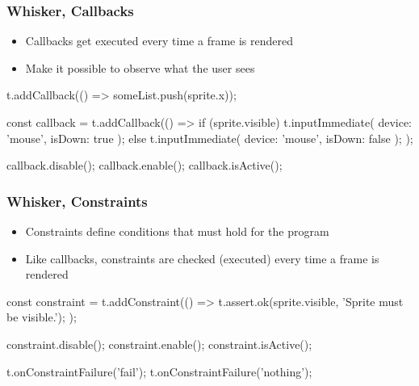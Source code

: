 \begin{frame}[fragile]\frametitle{Whisker, Callbacks}
    \begin{itemize}
        \item Callbacks get \textcolor{upfim}{executed every time a frame is rendered}
        \item Make it possible to \textcolor{upfim}{observe} what the user sees
    \end{itemize}

    \begin{javascriptcode}
        t.addCallback(() => someList.push(sprite.x));

        const callback = t.addCallback(() => {
            if (sprite.visible) {
                t.inputImmediate({ device: 'mouse', isDown: true });
            } else {
                t.inputImmediate({ device: 'mouse', isDown: false });
            }
        });

        callback.disable();
        callback.enable();
        callback.isActive();
    \end{javascriptcode}
\end{frame}

\begin{frame}[fragile]\frametitle{Whisker, Constraints}
    \begin{itemize}
        \item Constraints \textcolor{upfim}{define conditions} that must hold for the program
        \item Like callbacks, constraints are checked (executed) every time a frame is rendered
    \end{itemize}

    \begin{javascriptcode}
        const constraint = t.addConstraint(() => {
            t.assert.ok(sprite.visible, 'Sprite must be visible.');
        });

        constraint.disable();
        constraint.enable();
        constraint.isActive();

        t.onConstraintFailure('fail');
        t.onConstraintFailure('nothing');
    \end{javascriptcode}
\end{frame}

